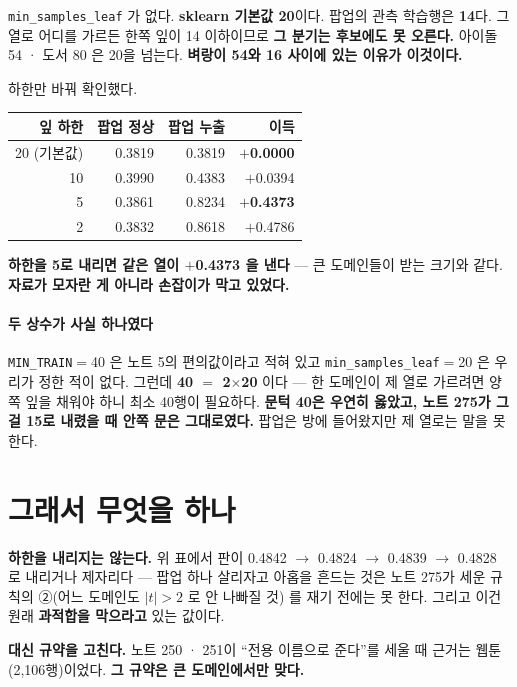 \documentclass[10pt]{article}
\begin{document}
\texttt{min\_samples\_leaf} 가 없다. \textbf{sklearn 기본값 20}이다. 팝업의
관측 학습행은 \textbf{14}다. 그 열로 어디를 가르든 한쪽 잎이 14 이하이므로
\textbf{그 분기는 후보에도 못 오른다.} 아이돌 54 · 도서 80 은 20을 넘는다.
\textbf{벼랑이 54와 16 사이에 있는 이유가 이것이다.}

하한만 바꿔 확인했다.

\begin{center}\small
\begin{tabular}{rrrr}
\hline
잎 하한 & 팝업 정상 & 팝업 누출 & 이득 \\
\hline
20 (기본값) & 0.3819 & 0.3819 & \textbf{$+$0.0000} \\
10 & 0.3990 & 0.4383 & $+$0.0394 \\
5 & 0.3861 & 0.8234 & \textbf{$+$0.4373} \\
2 & 0.3832 & 0.8618 & $+$0.4786 \\
\hline
\end{tabular}
\end{center}

\textbf{하한을 5로 내리면 같은 열이 $+$0.4373 을 낸다} --- 큰 도메인들이
받는 크기와 같다. \textbf{자료가 모자란 게 아니라 손잡이가 막고 있었다.}

\paragraph{두 상수가 사실 하나였다} \texttt{MIN\_TRAIN}$=$40 은 노트 5의
편의값이라고 적혀 있고 \texttt{min\_samples\_leaf}$=$20 은 우리가 정한 적이
없다. 그런데 \textbf{40 $=$ 2$\times$20} 이다 --- 한 도메인이 제 열로 가르려면
양쪽 잎을 채워야 하니 최소 40행이 필요하다. \textbf{문턱 40은 우연히 옳았고,
노트 275가 그걸 15로 내렸을 때 안쪽 문은 그대로였다.} 팝업은 방에 들어왔지만
제 열로는 말을 못 한다.

\section{그래서 무엇을 하나}

\textbf{하한을 내리지는 않는다.} 위 표에서 판이 0.4842 $\to$ 0.4824 $\to$
0.4839 $\to$ 0.4828 로 내리거나 제자리다 --- 팝업 하나 살리자고 아홉을
흔드는 것은 노트 275가 세운 규칙의 ②(어느 도메인도 $|t|{>}2$ 로 안 나빠질 것)
를 재기 전에는 못 한다. 그리고 이건 원래 \textbf{과적합을 막으라고} 있는
값이다.

\textbf{대신 규약을 고친다.} 노트 250 · 251이 ``전용 이름으로 준다''를 세울
때 근거는 웹툰(2,106행)이었다. \textbf{그 규약은 큰 도메인에서만 맞다.}
\end{document}
